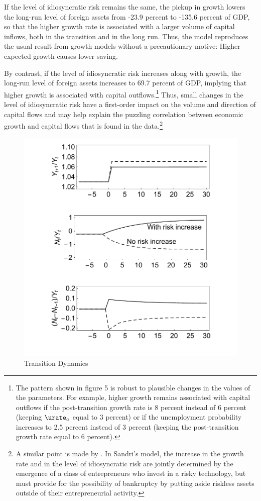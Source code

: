 \documentclass[titlepage]{\econtex}\newcommand{\texname}{cjSOE}
\begin{document}
If the level of idiosyncratic risk remains the same, the
pickup in growth lowers the long-run level of foreign assets from
-23.9 percent to -135.6 percent of GDP, so that the higher growth rate
is associated with a larger volume of capital inflows, both in the
transition and in the long run. Thus, the model reproduces the usual
result from growth models without a precautionary motive: Higher expected growth
causes lower saving.

By contrast, if the level of idiosyncratic risk increases along with growth,
the long-run level of foreign assets increases to 69.7 percent of GDP,
implying that higher growth is associated with capital
outflows.\footnote{The pattern shown in figure 5 is robust to
  plausible changes in the values of the parameters. For example,
  higher growth remains associated with capital outflows if the
  post-transition growth rate is 8 percent instead of 6 percent
  (keeping $\urate_a$ equal to 3 percent) or if the unemployment
  probability increases to 2.5 percent instead of 3 percent (keeping
  the post-transition growth rate equal to 6 percent).} Thus, small
changes in the level of idiosyncratic risk have a first-order impact
on the volume and direction of capital flows and may help explain the
puzzling correlation between economic growth and capital flows that is
found in the data.\footnote{A similar point is made by
  \cite{sandri:growthcapflows}. In Sandri's model, the increase in the
  growth rate and in the level of idiosyncratic risk are jointly
  determined by the emergence of a class of entrepreneurs who invest
  in a risky technology, but must provide for the possibility of
  bankruptcy by putting aside riskless assets outside of their
  entrepreneurial activity.}

\medskip

\begin{figure}
\includegraphics{./Figures/transDyn}
\caption{Transition Dynamics}\label{fig:transDyn}
\end{figure}
\medskip
\end{document}
